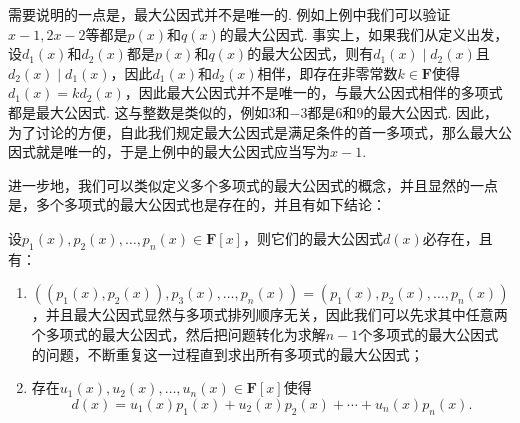需要说明的一点是，最大公因式并不是唯一的. 例如上例中我们可以验证$x-1,2x-2$等都是$p(x)$和$q(x)$的最大公因式. 事实上，如果我们从定义出发，设$d_1(x)$和$d_2(x)$都是$p(x)$和$q(x)$的最大公因式，则有$d_1(x)\mid d_2(x)$且$d_2(x)\mid d_1(x)$，因此$d_1(x)$和$d_2(x)$相伴，即存在非零常数$k\in\mathbf{F}$使得$d_1(x)=kd_2(x)$，因此最大公因式并不是唯一的，与最大公因式相伴的多项式都是最大公因式. 这与整数是类似的，例如$3$和$-3$都是$6$和$9$的最大公因式. 因此，为了讨论的方便，自此我们规定最大公因式是满足条件的首一多项式，那么最大公因式就是唯一的，于是上例中的最大公因式应当写为$x-1$.

进一步地，我们可以类似定义多个多项式的最大公因式的概念，并且显然的一点是，多个多项式的最大公因式也是存在的，并且有如下结论：
\begin{theorem}{}{}
    设$p_1(x),p_2(x),\ldots,p_n(x)\in\mathbf{F}[x]$，则它们的最大公因式$d(x)$必存在，且有：
    \begin{enumerate}
        \item $((p_1(x),p_2(x)),p_3(x),\ldots,p_n(x))=(p_1(x),p_2(x),\ldots,p_n(x))$，并且最大公因式显然与多项式排列顺序无关，因此我们可以先求其中任意两个多项式的最大公因式，然后把问题转化为求解$n-1$个多项式的最大公因式的问题，不断重复这一过程直到求出所有多项式的最大公因式；
        \item 存在$u_1(x),u_2(x),\ldots,u_n(x)\in\mathbf{F}[x]$使得
              \[d(x)=u_1(x)p_1(x)+u_2(x)p_2(x)+\cdots+u_n(x)p_n(x).\]
    \end{enumerate}
\end{theorem}


